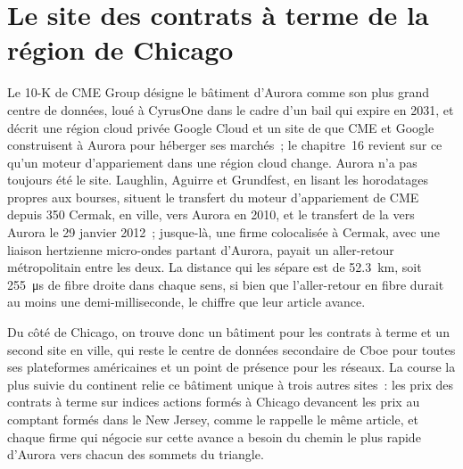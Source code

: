 \section{Le site des contrats à terme de la région de Chicago}

Le 10-K de CME Group désigne le bâtiment d'Aurora comme son plus grand centre de données, loué à CyrusOne dans le cadre d'un bail qui expire en 2031, et décrit une
région cloud privée Google Cloud et un site de  que CME et Google construisent à Aurora pour héberger ses marchés~; le chapitre~16 revient sur
ce qu'un moteur d'appariement dans une région cloud change. Aurora n'a pas toujours été le site. Laughlin, Aguirre et Grundfest, en lisant les
horodatages propres aux bourses, situent le transfert du moteur d'appariement de CME depuis 350 Cermak, en ville, vers Aurora en 2010, et le transfert de la
 vers Aurora le 29 janvier 2012~; jusque-là, une firme colocalisée à Cermak, avec une liaison hertzienne micro-ondes partant d'Aurora, payait un
aller-retour métropolitain entre les deux. La distance qui les sépare est de \qty{52.3}{\kilo\metre}, soit \qty{255}{\micro\second} de fibre droite dans chaque sens, si bien que l'aller-retour
en fibre durait au moins une demi-milliseconde, le chiffre que leur article avance.

Du côté de Chicago, on trouve donc un bâtiment pour les contrats à terme et un second site en ville, qui reste le centre de données secondaire de Cboe pour toutes ses
plateformes américaines et un point de présence pour les réseaux. La course la plus suivie du continent relie ce bâtiment unique à trois autres sites~: les prix des contrats à terme sur indices
actions formés à Chicago devancent les prix au comptant formés dans le New Jersey, comme le rappelle le même article, et chaque firme qui négocie sur cette avance
a besoin du chemin le plus rapide d'Aurora vers chacun des sommets du triangle.

